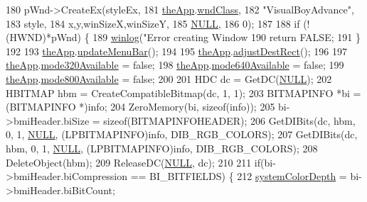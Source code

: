 \begin{DoxyCode}
180   pWnd->CreateEx(styleEx,
181                  \mbox{\hyperlink{_v_b_a_8cpp_a8095a9d06b37a7efe3723f3218ad8fb3}{theApp}}.\mbox{\hyperlink{class_v_b_a_acd3b584c09c85ec31168b1f7d1d8505e}{wndClass}},
182                  \textcolor{stringliteral}{"VisualBoyAdvance"},
183                  style,
184                  x,y,winSizeX,winSizeY,
185                  \mbox{\hyperlink{getopt1_8c_a070d2ce7b6bb7e5c05602aa8c308d0c4}{NULL}},
186                  0);
187   
188   \textcolor{keywordflow}{if} (!(HWND)*pWnd) \{
189     \mbox{\hyperlink{_g_d_i_display_8cpp_aceca31284db939464c9dc0fb15c92786}{winlog}}(\textcolor{stringliteral}{"Error creating Window %
190     \textcolor{keywordflow}{return} FALSE;
191   \}
192   
193   \mbox{\hyperlink{_v_b_a_8cpp_a8095a9d06b37a7efe3723f3218ad8fb3}{theApp}}.\mbox{\hyperlink{class_v_b_a_accf3451bad473b90400193636cd27c96}{updateMenuBar}}();
194   
195   \mbox{\hyperlink{_v_b_a_8cpp_a8095a9d06b37a7efe3723f3218ad8fb3}{theApp}}.\mbox{\hyperlink{class_v_b_a_acb822065cba8b15810c5a61fd05ca831}{adjustDestRect}}();
196   
197   \mbox{\hyperlink{_v_b_a_8cpp_a8095a9d06b37a7efe3723f3218ad8fb3}{theApp}}.\mbox{\hyperlink{class_v_b_a_adcefc742bdb15ddb902bcb2df896d298}{mode320Available}} = \textcolor{keyword}{false};
198   \mbox{\hyperlink{_v_b_a_8cpp_a8095a9d06b37a7efe3723f3218ad8fb3}{theApp}}.\mbox{\hyperlink{class_v_b_a_adc44d61208b927bde7ea49c25a2e30bc}{mode640Available}} = \textcolor{keyword}{false};
199   \mbox{\hyperlink{_v_b_a_8cpp_a8095a9d06b37a7efe3723f3218ad8fb3}{theApp}}.\mbox{\hyperlink{class_v_b_a_a3e2e940c6531daba73473c51a9916574}{mode800Available}} = \textcolor{keyword}{false};
200   
201   HDC dc = GetDC(\mbox{\hyperlink{getopt1_8c_a070d2ce7b6bb7e5c05602aa8c308d0c4}{NULL}});
202   HBITMAP hbm = CreateCompatibleBitmap(dc, 1, 1);
203   BITMAPINFO *bi = (BITMAPINFO *)info;
204   ZeroMemory(bi, \textcolor{keyword}{sizeof}(info));
205   bi->bmiHeader.biSize = \textcolor{keyword}{sizeof}(BITMAPINFOHEADER);
206   GetDIBits(dc, hbm, 0, 1, \mbox{\hyperlink{getopt1_8c_a070d2ce7b6bb7e5c05602aa8c308d0c4}{NULL}}, (LPBITMAPINFO)info, DIB\_RGB\_COLORS);  
207   GetDIBits(dc, hbm, 0, 1, \mbox{\hyperlink{getopt1_8c_a070d2ce7b6bb7e5c05602aa8c308d0c4}{NULL}}, (LPBITMAPINFO)info, DIB\_RGB\_COLORS);
208   DeleteObject(hbm);
209   ReleaseDC(\mbox{\hyperlink{getopt1_8c_a070d2ce7b6bb7e5c05602aa8c308d0c4}{NULL}}, dc);
210 
211   \textcolor{keywordflow}{if}(bi->bmiHeader.biCompression == BI\_BITFIELDS) \{
212     \mbox{\hyperlink{system_8cpp_adaf454a4617a00b5cfed14c203ab6efa}{systemColorDepth}} = bi->bmiHeader.biBitCount;
}
\end{DoxyCode}
